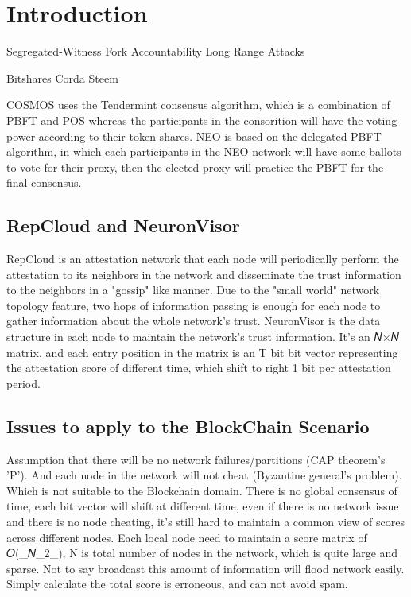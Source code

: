 \section{Introduction}

Segregated-Witness
Fork Accountability
Long Range Attacks

Bitshares
Corda
Steem

COSMOS uses the Tendermint consensus algorithm, which is a combination of PBFT and POS whereas the participants in the consorition will have the voting power according to their token shares.
NEO is based on the delegated PBFT algorithm, in which each participants in the NEO network will have some ballots to vote for their proxy, then the elected proxy will practice the PBFT for the final consensus.

\subsection{RepCloud and NeuronVisor}
RepCloud is an attestation network that each node will periodically perform the attestation to its neighbors in the network and disseminate the trust information to the neighbors in a "gossip" like manner. 
Due to the "small world" network topology feature, two hops of information passing is enough for each node to gather information about the whole network's trust. 
NeuronVisor is the data structure in each node to maintain the network's trust information. It's an 𝑁×𝑁 matrix, and each entry position in the matrix is an T bit bit vector representing the attestation score of different time, which shift to right 1 bit per attestation period.

\subsection{Issues to apply to the BlockChain Scenario}
Assumption that there will be no network failures/partitions (CAP theorem's 'P'). And each node in the network will not cheat (Byzantine general's problem). Which is not suitable to the Blockchain domain.
There is no global consensus of time, each bit vector will shift at different time, even if there is no network issue and there is no node cheating, it's still hard to maintain a common view of scores across different nodes.
Each local node need to maintain a score matrix of 𝑂(_𝑁_2_), N is total number of nodes in the network, which is quite large and sparse. Not to say broadcast this amount of information will flood network easily.
Simply calculate the total score is erroneous, and can not avoid spam.


